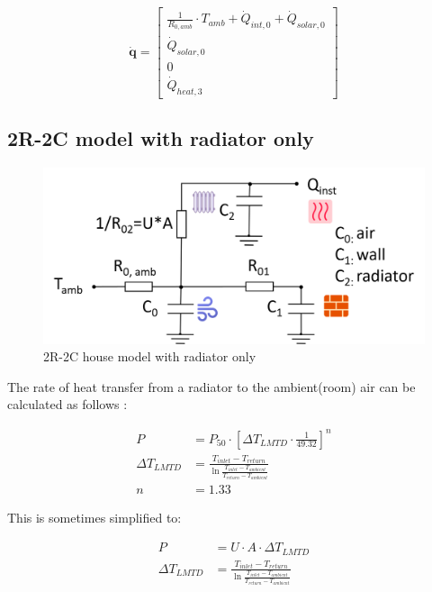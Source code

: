 \begin{equation}
	\mathbf{\dot{q}} =
	\begin{bmatrix}
		\frac{1}{R_{0, amb}} \cdot T_{amb} + \dot{Q}_{int, 0} + \dot{Q}_{solar, 0} \\
		\dot{Q}_{solar, 0} \\
		0 \\
		\dot{Q}_{heat, 3}
	\end{bmatrix}
\end{equation}

\subsection{2R-2C model with radiator only}

\begin{figure}[H]
	\centering
	\includegraphics[width=0.7\columnwidth]{Figures/2R2C_radiator.png}
	\caption[Short title]{2R-2C house model with radiator only}
	\label{fig:2R2Cradiator}
\end{figure} 

The rate of heat transfer from a radiator to the ambient(room) air can be calculated as follows \cite{heatemissionrad}:

\begin{equation}
	\begin{aligned}
	    P & = P_{50} \cdot \left[\Delta T_{LMTD} \cdot \frac{1}{49.32}\right]^n \\
	    \Delta T_{LMTD} & = \frac{ T_{inlet} - T_{return} }{\ln \frac{ T_{inlet} - T_{ambient} }{T_{return} - T_{ambient}}} \\
	    n & = 1.33
    \end{aligned}
\end{equation}

This is sometimes simplified to:

\begin{equation}
	\begin{aligned}
		P & = U \cdot A \cdot \Delta T_{LMTD} \\
		\Delta T_{LMTD} & = \frac{ T_{inlet} - T_{return} }{\ln \frac{ T_{inlet} - T_{ambient} }{T_{return} - T_{ambient}}}
	\end{aligned}
\end{equation}

